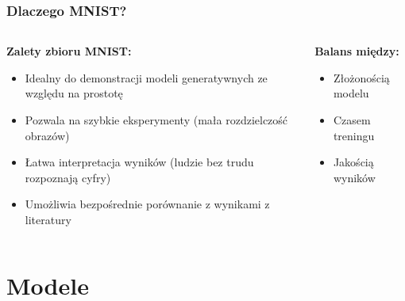 \documentclass{beamer}
\begin{document}
\begin{frame}
  \frametitle{Dlaczego MNIST?}
  
  \begin{columns}[T]
  \begin{column}{0.6\textwidth}
      \textbf{Zalety zbioru MNIST:}
      \begin{itemize}
          \item Idealny do demonstracji modeli generatywnych ze względu na prostotę
          \item Pozwala na szybkie eksperymenty (mała rozdzielczość obrazów)
          \item Łatwa interpretacja wyników (ludzie bez trudu rozpoznają cyfry)
          \item Umożliwia bezpośrednie porównanie z wynikami z literatury
      \end{itemize}
  \end{column}
  
  \begin{column}{0.4\textwidth}
      \vspace{0.5cm}
      \begin{tcolorbox}[colback=yellow!10!white, colframe=black!60, boxrule=0.5pt, arc=3mm]
          \centering
          \textbf{Balans między:}
          \begin{itemize}
              \item Złożonością modelu
              \item Czasem treningu
              \item Jakością wyników
          \end{itemize}
      \end{tcolorbox}
  \end{column}
  \end{columns}
\end{frame}


\section{Modele}
\end{document}
